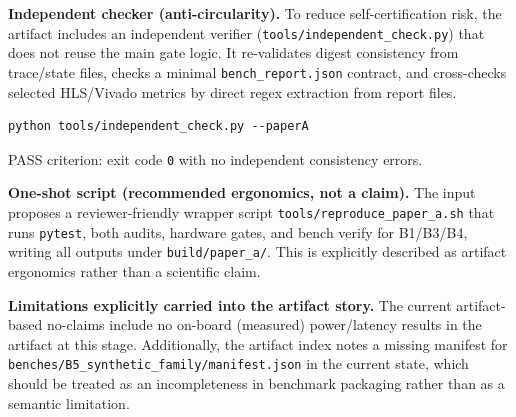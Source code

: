 \textbf{Independent checker (anti-circularity).}
To reduce self-certification risk, the artifact includes an independent verifier (\texttt{tools/independent\_check.py}) that does not reuse the main gate logic. It re-validates digest consistency from trace/state files, checks a minimal \texttt{bench\_report.json} contract, and cross-checks selected HLS/Vivado metrics by direct regex extraction from report files.
\begin{verbatim}
python tools/independent_check.py --paperA
\end{verbatim}
PASS criterion: exit code \texttt{0} with no independent consistency errors.

\textbf{One-shot script (recommended ergonomics, not a claim).}
The input proposes a reviewer-friendly wrapper script \texttt{tools/reproduce\_paper\_a.sh} that runs \texttt{pytest}, both audits, hardware gates, and bench verify for B1/B3/B4, writing all outputs under \texttt{build/paper\_a/}. This is explicitly described as artifact ergonomics rather than a scientific claim.

\textbf{Limitations explicitly carried into the artifact story.}
The current artifact-based no-claims include no on-board (measured) power/latency results in the artifact at this stage. Additionally, the artifact index notes a missing manifest for \texttt{benches/B5\_synthetic\_family/manifest.json} in the current state, which should be treated as an incompleteness in benchmark packaging rather than as a semantic limitation.
